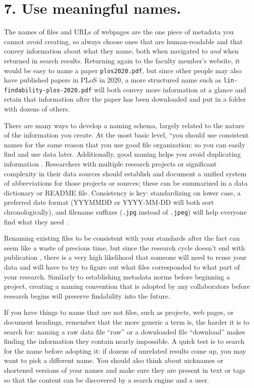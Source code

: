 \documentclass[10pt,letterpaper]{article}
\newcommand{\rulemajor}[1]{\section*{#1}}
\begin{document}
\rulemajor{7. Use meaningful names.}

The names of files and URLs of webpages are the one piece of metadata you cannot
avoid creating, so always choose ones that are human-readable and that convey
information about what they name, both when navigated to \emph{and} when
returned in search results. Returning again to the faculty member's website, it
would be easy to name a paper \texttt{plos2020.pdf}, but since other people may
also have published papers in PLoS in 2020, a more structured name such as
\texttt{lin-findability-plos-2020.pdf} will both convey more information at a
glance and retain that information after the paper has been downloaded and put
in a folder with dozens of others.

There are many ways to develop a naming schema, largely related to the nature of
the information you create. At the most basic level, ``you should use
consistent names for the same reason that you use good file organization: so you
can easily find and use data later. Additionally, good naming helps you avoid
duplicating information \cite{Briney2015}. Researchers with multiple research
projects or significant complexity in their data sources should establish and
document a unified system of abbreviations for those projects or sources; these
can be summarized in a data dictionary or README file. Consistency is key:
standardizing on lower case, a preferred date format (YYYMMDD or YYYY-MM-DD will
both sort chronologically), and filename suffixes (\texttt{.jpg} instead of
\texttt{.jpeg}) will help everyone find what they need
\cite{Wilson2014,Wilson2017}.

Renaming existing files to be consistent with your standards after the fact can
seem like a waste of precious time, but since the research cycle doesn't end
with publication \cite{Briney2015}, there is a very high likelihood that someone
will need to reuse your data and will have to try to figure out what files
corresponded to what part of your research. Similarly to establishing metadata
norms before beginning a project, creating a naming convention that is adopted
by any collaborators before research begins will preserve findability into the
future.

If you have things to name that are not files, such as projects, web pages, or
document headings, remember that the more generic a term is, the harder it is to
search for: naming a raw data file ``raw'' or a downloaded file ``download''
makes finding the information they contain nearly impossible. A quick test is
to search for the name before adopting it: if dozens of unrelated results come
up, you may want to pick a different name. You should also think about
nicknames or shortened versions of your names and make sure they are present in
text or tags so that the content can be discovered by a search engine and a
user.
\end{document}

